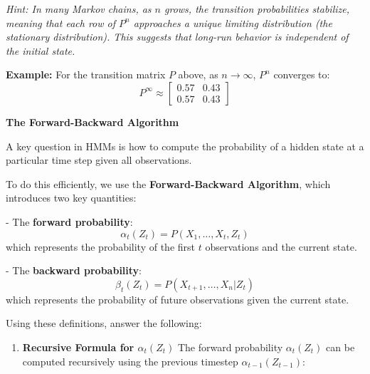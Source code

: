 \documentclass[12pt,letterpaper, onecolumn]{exam}
\begin{document}
\begin{questions}
\begin{enumerate}[label=(\alph*)]
\textit{Hint: In many Markov chains, as \( n \) grows, the transition probabilities stabilize, meaning that each row of \( P^n \) approaches a unique limiting distribution (the stationary distribution). This suggests that long-run behavior is independent of the initial state.}

\textbf{Example:}
For the transition matrix \( P \) above, as \( n \to \infty \), \( P^n \) converges to:
\[
P^\infty \approx
\begin{bmatrix}
0.57 & 0.43 \\
0.57 & 0.43
\end{bmatrix}
\]

\end{enumerate}

\begin{solution}
    \begin{parts}
        \part
        \part
        \part
    \end{parts}
\end{solution}


\question[20 points]\textbf{The Forward-Backward Algorithm}\droppoints

A key question in HMMs is how to compute the probability of a hidden state at a particular time step given all observations.

To do this efficiently, we use the \textbf{Forward-Backward Algorithm}, which introduces two key quantities:

- The \textbf{forward probability}:
  \[
  \alpha_t(Z_t) = P(X_1, \dots, X_t, Z_t)
  \]
  which represents the probability of the first \( t \) observations and the current state.

- The \textbf{backward probability}:
  \[
  \beta_t(Z_t) = P(X_{t+1}, \dots, X_n | Z_t)
  \]
  which represents the probability of future observations given the current state.

Using these definitions, answer the following:

\begin{enumerate}[label=(\alph*)]
    \item \textbf{Recursive Formula for \( \alpha_t(Z_t) \)}
    The forward probability \( \alpha_t(Z_t) \) can be computed recursively using the previous timestep \( \alpha_{t-1}(Z_{t-1}) \):


\end{enumerate}
\end{questions}
\end{document}
